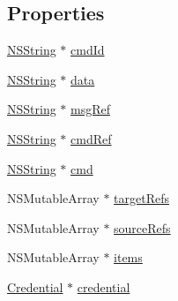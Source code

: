 \subsection*{\-Properties}
\begin{DoxyCompactItemize}
\item 
\hyperlink{class_n_s_string}{\-N\-S\-String} $\ast$ \hyperlink{interface_status_a159f6f2b5ae692e703fb370fd7279bbd}{cmd\-Id}
\item 
\hyperlink{class_n_s_string}{\-N\-S\-String} $\ast$ \hyperlink{interface_status_ac06f5da58bf99e8e90b86292ab46c3f8}{data}
\item 
\hyperlink{class_n_s_string}{\-N\-S\-String} $\ast$ \hyperlink{interface_status_a516d210e3c32cbaa52894ab121e7fd98}{msg\-Ref}
\item 
\hyperlink{class_n_s_string}{\-N\-S\-String} $\ast$ \hyperlink{interface_status_a8b0daa66894a959a79890741bd9de21d}{cmd\-Ref}
\item 
\hyperlink{class_n_s_string}{\-N\-S\-String} $\ast$ \hyperlink{interface_status_a9959f4e9a9165f571808d7daf5cf1094}{cmd}
\item 
\-N\-S\-Mutable\-Array $\ast$ \hyperlink{interface_status_ab226762144cd8525a8388e5ea30e401b}{target\-Refs}
\item 
\-N\-S\-Mutable\-Array $\ast$ \hyperlink{interface_status_ab155041b270431133981aaf082955d42}{source\-Refs}
\item 
\-N\-S\-Mutable\-Array $\ast$ \hyperlink{interface_status_a99254ef93516d40c98bceed4bef8493e}{items}
\item 
\hyperlink{interface_credential}{\-Credential} $\ast$ \hyperlink{interface_status_a0c9b7697d88c35028c4761d5412153bd}{credential}
\end{DoxyCompactItemize}


